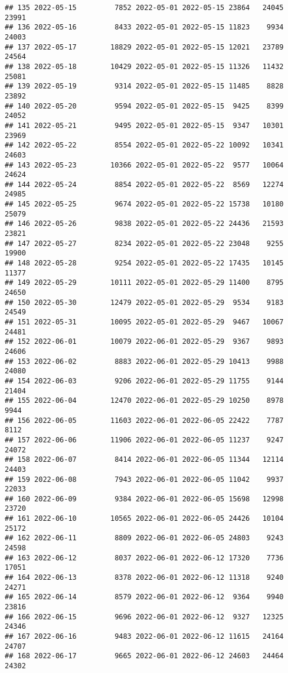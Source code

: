 \documentclass[
]{article}
\begin{document}
\begin{verbatim}
## 135 2022-05-15         7852 2022-05-01 2022-05-15 23864   24045      23991
## 136 2022-05-16         8433 2022-05-01 2022-05-15 11823    9934      24003
## 137 2022-05-17        18829 2022-05-01 2022-05-15 12021   23789      24564
## 138 2022-05-18        10429 2022-05-01 2022-05-15 11326   11432      25081
## 139 2022-05-19         9314 2022-05-01 2022-05-15 11485    8828      23892
## 140 2022-05-20         9594 2022-05-01 2022-05-15  9425    8399      24052
## 141 2022-05-21         9495 2022-05-01 2022-05-15  9347   10301      23969
## 142 2022-05-22         8554 2022-05-01 2022-05-22 10092   10341      24603
## 143 2022-05-23        10366 2022-05-01 2022-05-22  9577   10064      24624
## 144 2022-05-24         8854 2022-05-01 2022-05-22  8569   12274      24985
## 145 2022-05-25         9674 2022-05-01 2022-05-22 15738   10180      25079
## 146 2022-05-26         9838 2022-05-01 2022-05-22 24436   21593      23821
## 147 2022-05-27         8234 2022-05-01 2022-05-22 23048    9255      19900
## 148 2022-05-28         9254 2022-05-01 2022-05-22 17435   10145      11377
## 149 2022-05-29        10111 2022-05-01 2022-05-29 11400    8795      24650
## 150 2022-05-30        12479 2022-05-01 2022-05-29  9534    9183      24549
## 151 2022-05-31        10095 2022-05-01 2022-05-29  9467   10067      24481
## 152 2022-06-01        10079 2022-06-01 2022-05-29  9367    9893      24606
## 153 2022-06-02         8883 2022-06-01 2022-05-29 10413    9988      24080
## 154 2022-06-03         9206 2022-06-01 2022-05-29 11755    9144      21404
## 155 2022-06-04        12470 2022-06-01 2022-05-29 10250    8978       9944
## 156 2022-06-05        11603 2022-06-01 2022-06-05 22422    7787       8112
## 157 2022-06-06        11906 2022-06-01 2022-06-05 11237    9247      24072
## 158 2022-06-07         8414 2022-06-01 2022-06-05 11344   12114      24403
## 159 2022-06-08         7943 2022-06-01 2022-06-05 11042    9937      22033
## 160 2022-06-09         9384 2022-06-01 2022-06-05 15698   12998      23720
## 161 2022-06-10        10565 2022-06-01 2022-06-05 24426   10104      25172
## 162 2022-06-11         8809 2022-06-01 2022-06-05 24803    9243      24598
## 163 2022-06-12         8037 2022-06-01 2022-06-12 17320    7736      17051
## 164 2022-06-13         8378 2022-06-01 2022-06-12 11318    9240      24271
## 165 2022-06-14         8579 2022-06-01 2022-06-12  9364    9940      23816
## 166 2022-06-15         9696 2022-06-01 2022-06-12  9327   12325      24346
## 167 2022-06-16         9483 2022-06-01 2022-06-12 11615   24164      24707
## 168 2022-06-17         9665 2022-06-01 2022-06-12 24603   24464      24302

\end{verbatim}
\end{document}
